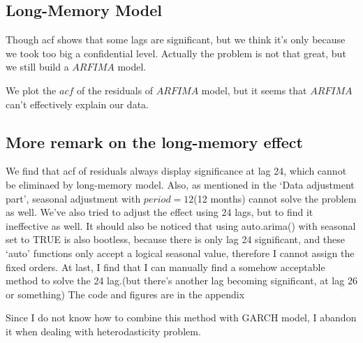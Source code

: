 \documentclass[a4paper,10pt]{article}
\begin{document}
\subsection{Long-Memory Model}
Though acf shows that some lags are significant, but we think it's only because we took too big a confidential level. Actually the problem is not that great, but we still build a $ARFIMA$ model. \par
We plot the $acf$ of the residuals of $ARFIMA$ model, but it seems that $ARFIMA$ can't effectively explain our data.

\subsection{More remark on the long-memory effect}
We find that acf of residuals always display significance at lag 24, which cannot be eliminaed by long-memory model. Also, as mentioned in the `Data adjustment part', seasonal adjustment with $period = 12$(12 months) cannot solve the problem as well. We've also tried to adjust the effect using $24$ lags, but to find it ineffective as well. It should also be noticed that using auto.arima() with seasonal set to TRUE is also bootless, because there is only lag 24 significant, and these `auto' functions only accept a logical seasonal value, therefore I cannot assign the fixed orders. At last, I find that I can manually find a somehow acceptable method to solve the 24 lag.(but there's another lag becoming significant, at lag 26 or something) The code and figures are in the appendix\par
Since I do not know how to combine this method with GARCH model, I abandon it when dealing with heterodasticity problem. 
\end{document}
